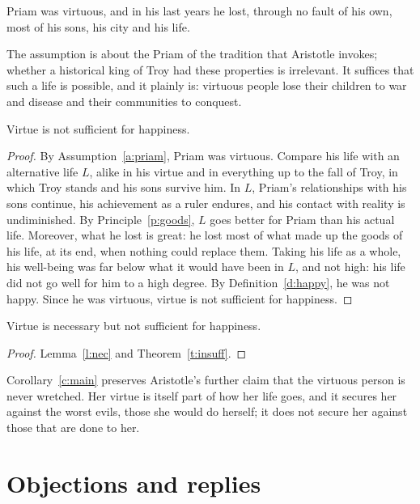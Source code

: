 \documentclass{situationist-preprint}
\begin{document}
\begin{assumption}[Priam]\label{a:priam}
Priam was virtuous, and in his last years he lost, through no fault of his own, most of his sons, his city and his life.
\end{assumption}

The assumption is about the Priam of the tradition that Aristotle invokes; whether a historical king of Troy had these properties is irrelevant. It suffices that such a life is possible, and it plainly is: virtuous people lose their children to war and disease and their communities to conquest.

\begin{theorem}\label{t:insuff}
Virtue is not sufficient for happiness.
\end{theorem}

\begin{proof}
By Assumption~\ref{a:priam}, Priam was virtuous. Compare his life with an alternative life $L$, alike in his virtue and in everything up to the fall of Troy, in which Troy stands and his sons survive him. In $L$, Priam's relationships with his sons continue, his achievement as a ruler endures, and his contact with reality is undiminished. By Principle~\ref{p:goods}, $L$ goes better for Priam than his actual life. Moreover, what he lost is great: he lost most of what made up the goods of his life, at its end, when nothing could replace them. Taking his life as a whole, his well-being was far below what it would have been in $L$, and not high: his life did not go well for him to a high degree. By Definition~\ref{d:happy}, he was not happy. Since he was virtuous, virtue is not sufficient for happiness.
\end{proof}

\begin{corollary}\label{c:main}
Virtue is necessary but not sufficient for happiness.
\end{corollary}

\begin{proof}
Lemma~\ref{l:nec} and Theorem~\ref{t:insuff}.
\end{proof}

Corollary~\ref{c:main} preserves Aristotle's further claim that the virtuous person is never wretched. Her virtue is itself part of how her life goes, and it secures her against the worst evils, those she would do herself; it does not secure her against those that are done to her.

\section{Objections and replies}
\end{document}
